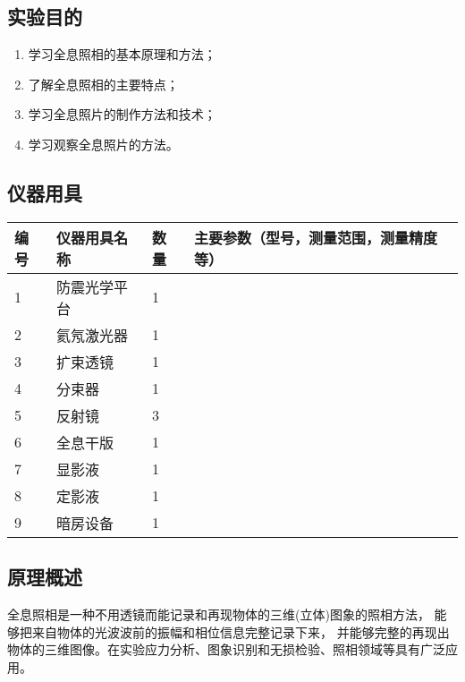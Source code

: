 \documentclass[dvipsnames, svgnames,a4paper,11pt]{article}
\begin{document}
\subsection{实验目的}
	\begin{enumerate}
		\item 学习全息照相的基本原理和方法；
		\item 了解全息照相的主要特点；
		\item 学习全息照片的制作方法和技术；
		\item 学习观察全息照片的方法。
		
		
	\end{enumerate}

\subsection{仪器用具}
\begin{table}[htbp]
	\centering
	\renewcommand\arraystretch{1.6}
	\begin{tabular}{p{}|p{}|p{}|p{}}
	\hline
	编号& 仪器用具名称 & 数量 &  主要参数（型号，测量范围，测量精度等） \\
	\hline
	1  & 防震光学平台 & 1  & ~  \\
	2  & 氦氖激光器  & 1  & ~  \\
	3  & 扩束透镜   & 1  & ~  \\
	4  & 分束器    & 1  & ~  \\
	5  & 反射镜    & 3  & ~  \\
	6  & 全息干版   & 1  & ~  \\
	7  & 显影液    & 1  & ~  \\
	8  & 定影液    & 1  & ~  \\
	9  & 暗房设备   & 1  & ~  \\
	\hline
\end{tabular}
\end{table}

\subsection{原理概述}
	
	全息照相是一种不用透镜而能记录和再现物体的三维(立体)图象的照相方法， 能够把来自物体的光波波前的振幅和相位信息完整记录下来， 并能够完整的再现出物体的三维图像。在实验应力分析、图象识别和无损检验、照相领域等具有广泛应用。
	
\end{document}
